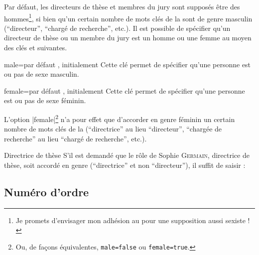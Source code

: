 %
%
Par défaut, les directeurs de thèse et membres du jury sont supposés être des
hommes\footnote{Je promets d'envisager mon adhésion au  pour une
  supposition aussi sexiste !}, si bien qu'un certain nombre de mots clés de la
\yatCl{} sont de genre masculin (\enquote{directeur}, \enquote{chargé de
  recherche}, etc.). Il est possible de spécifier qu'un directeur de thèse ou
un membre du jury est un homme ou une femme au moyen des clés  et
 suivantes.

\begin{docKey}{male}{=\textbar{}}{par défaut
    , initialement }
  Cette clé permet de spécifier qu'une personne est ou pas de sexe masculin.
\end{docKey}

\begin{docKey}{female}{=\textbar{}}{par défaut
    , initialement }
  Cette clé permet de spécifier qu'une personne est ou pas de sexe féminin.
\end{docKey}

L'option |female|\footnote{Ou, de façons équivalentes,
  \protect\lstinline+male=false+ ou \protect\lstinline+female=true+.} n'a pour
effet que d'accorder en genre féminin un certain nombre de mots clés de la
\yatCl{} (\enquote{directrice} au lieu \enquote{directeur}, \enquote{chargée de
  recherche} au lieu \enquote{chargé de recherche}, etc.).

\begin{dbexample}{Directrice de thèse}{}
  S'il est demandé que le rôle de Sophie \textsc{Germain}, directrice de thèse,
  soit accordé en genre (\enquote{directrice} et non \enquote{directeur}), il
  suffit de saisir :
\begin{preamblecode}[listing options={deletekeywords={[5]supervisor}}]
\end{preamblecode}
\end{dbexample}

\subsection{Numéro d'ordre}
\label{sec-numero-dordre}

